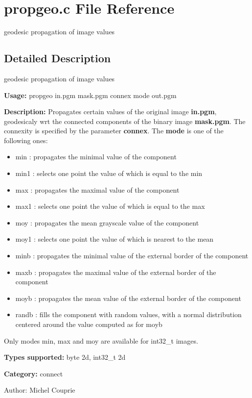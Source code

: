 \section{propgeo.c File Reference}
\label{propgeo_8c}
geodesic propagation of image values  




\label{_details}
\subsection{Detailed Description}
geodesic propagation of image values 

{\bf Usage:} propgeo in.pgm mask.pgm connex mode out.pgm

{\bf Description:} Propagates certain values of the original image {\bf in.pgm}, geodesicaly wrt the connected components of the binary image {\bf mask.pgm}. The connexity is specified by the parameter {\bf connex}. The {\bf mode} is one of the following ones: \begin{itemize}
\item min : propagates the minimal value of the component \item min1 : selects one point the value of which is equal to the min \item max : propagates the maximal value of the component \item max1 : selects one point the value of which is equal to the max \item moy : propagates the mean grayscale value of the component \item moy1 : selects one point the value of which is nearest to the mean \item minb : propagates the minimal value of the external border of the component \item maxb : propagates the maximal value of the external border of the component \item moyb : propagates the mean value of the external border of the component \item randb : fills the component with random values, with a normal distribution centered around the value computed as for moyb\end{itemize}
Only modes min, max and moy are available for int32\_\-t images.

{\bf Types supported:} byte 2d, int32\_\-t 2d

{\bf Category:} connect

\begin{Desc}
\item[Author:]Michel Couprie \end{Desc}
